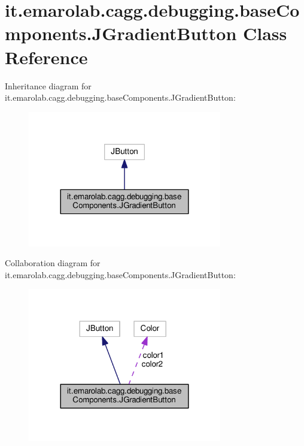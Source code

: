 \hypertarget{classit_1_1emarolab_1_1cagg_1_1debugging_1_1baseComponents_1_1JGradientButton}{\section{it.\-emarolab.\-cagg.\-debugging.\-base\-Components.\-J\-Gradient\-Button Class Reference}
\label{classit_1_1emarolab_1_1cagg_1_1debugging_1_1baseComponents_1_1JGradientButton}
}


Inheritance diagram for it.\-emarolab.\-cagg.\-debugging.\-base\-Components.\-J\-Gradient\-Button\-:\nopagebreak
\begin{figure}[H]
\begin{center}
\leavevmode
\includegraphics[width=240pt]{classit_1_1emarolab_1_1cagg_1_1debugging_1_1baseComponents_1_1JGradientButton__inherit__graph}
\end{center}
\end{figure}


Collaboration diagram for it.\-emarolab.\-cagg.\-debugging.\-base\-Components.\-J\-Gradient\-Button\-:\nopagebreak
\begin{figure}[H]
\begin{center}
\leavevmode
\includegraphics[width=240pt]{classit_1_1emarolab_1_1cagg_1_1debugging_1_1baseComponents_1_1JGradientButton__coll__graph}
\end{center}
\end{figure}
